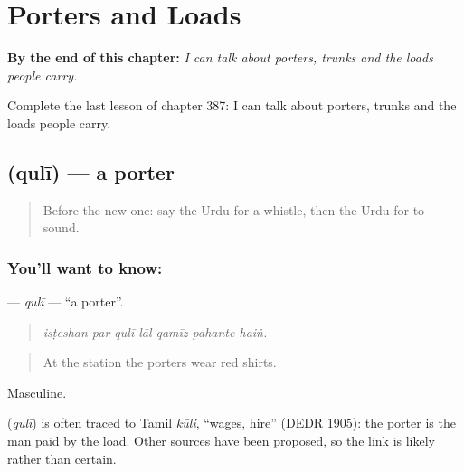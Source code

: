
\chapter{Porters and Loads}
\label{ch:ur-porters-and-loads}

\begin{chapteropening}
\textbf{By the end of this chapter:} \emph{I can talk about porters, trunks and the loads people carry.}

Complete the last lesson of chapter 387: I can talk about porters, trunks and the loads people carry.
\end{chapteropening}

\section[\texorpdfstring{\ur{قلی} (qulī)}{قلی (qulī)}]{ (qulī) — a porter}

\label{lesson:UR-C387-quli}



\begin{quote}
Before the new one: say the Urdu for a whistle, then the Urdu for to sound.
\end{quote}

\subsection*{You'll want to know: }
\textbf{} — \emph{qulī} — \textquotedblleft{}a porter\textquotedblright{}.

\begin{quote}
      
\end{quote}

\begin{quote}
\emph{isṭeshan par qulī lāl qamīz pahante haiṅ.}
\end{quote}

\begin{quote}
At the station the porters wear red shirts.
\end{quote}

Masculine.

\begin{cousinweb}
\textbf{} (\emph{qulī}) is often traced to Tamil \emph{kūli}, \textquotedblleft{}wages, hire\textquotedblright{} (DEDR 1905): the porter is the man paid by the load. Other sources have been proposed, so the link is likely rather than certain.
\end{cousinweb}

